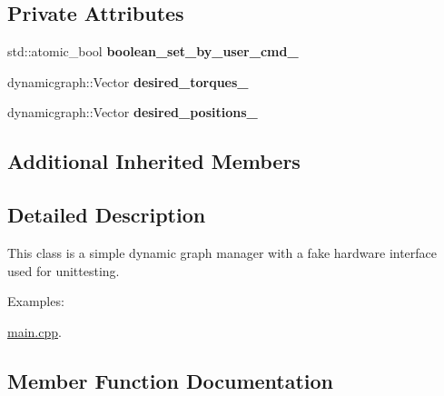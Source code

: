 \subsection*{Private Attributes}
\begin{DoxyCompactItemize}
\item 
std\+::atomic\+\_\+bool {\bfseries boolean\+\_\+set\+\_\+by\+\_\+user\+\_\+cmd\+\_\+}\hypertarget{classdynamic__graph__manager_1_1SimpleDGM_aa8dfcc77796249b13b61b7a3c4a54d3e}{}\label{classdynamic__graph__manager_1_1SimpleDGM_aa8dfcc77796249b13b61b7a3c4a54d3e}

\item 
dynamicgraph\+::\+Vector {\bfseries desired\+\_\+torques\+\_\+}\hypertarget{classdynamic__graph__manager_1_1SimpleDGM_a4bebf8a5b309160a26bfcc9c1f18f9df}{}\label{classdynamic__graph__manager_1_1SimpleDGM_a4bebf8a5b309160a26bfcc9c1f18f9df}

\item 
dynamicgraph\+::\+Vector {\bfseries desired\+\_\+positions\+\_\+}\hypertarget{classdynamic__graph__manager_1_1SimpleDGM_a46ad5e1d2ac144f8bc799480b6dfda45}{}\label{classdynamic__graph__manager_1_1SimpleDGM_a46ad5e1d2ac144f8bc799480b6dfda45}

\end{DoxyCompactItemize}
\subsection*{Additional Inherited Members}


\subsection{Detailed Description}
This class is a simple dynamic graph manager with a fake hardware interface used for unittesting. \begin{Desc}
\item[Examples\+: ]\par
\hyperlink{main_8cpp-example}{main.\+cpp}.\end{Desc}


\subsection{Member Function Documentation}
